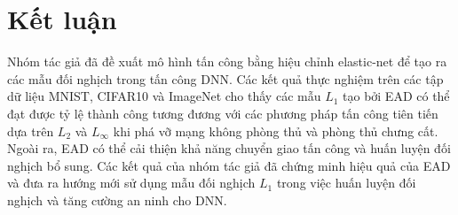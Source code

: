 \chapter{Kết luận}
Nhóm tác giả đã đề xuất mô hình tấn công bằng hiệu chỉnh elastic-net để tạo ra các mẫu đối nghịch trong tấn công DNN. Các kết quả thực nghiệm trên các tập dữ liệu MNIST, CIFAR10 và ImageNet cho thấy các mẫu $L_1$ tạo bởi EAD có thể đạt được tỷ lệ thành công tương đương với các phương pháp tấn công tiên tiến dựa trên $L_2$ và $L_{\infty}$ khi phá vỡ mạng không phòng thủ và phòng thủ chưng cất. Ngoài ra, EAD có thể cải thiện khả năng chuyển giao tấn công và huấn luyện đối nghịch bổ sung. Các kết quả của nhóm tác giả đã chứng minh hiệu quả của EAD và đưa ra hướng mới sử dụng mẫu đối nghịch $L_1$ trong việc huấn luyện đối nghịch và tăng cường an ninh cho DNN.
